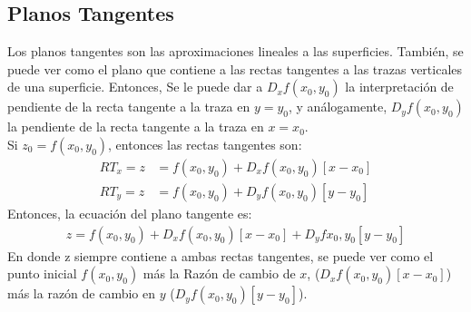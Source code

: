 \documentclass[12pt, letterpaper]{report}
\begin{document}
\subsection*{Planos Tangentes}
Los planos tangentes son las aproximaciones lineales a las superficies. También, se puede ver como el 
plano que contiene a las rectas tangentes a las trazas verticales de una superficie. Entonces, 
Se le puede dar a $D_{x}f(x_0, y_0)$ la interpretación de pendiente de la recta tangente a la traza en $y = y_0$, y 
análogamente, $D_yf(x_0, y_0)$ la pendiente de la recta tangente a la traza en $x = x_0$. \\ 

Si $z_0 = f(x_0, y_0)$, entonces las rectas tangentes son: 
\begin{align}
RT_x = z &= f(x_0, y_0) + D_xf(x_0, y_0)[x-x_0] \\
RT_y = z &= f(x_0, y_0) + D_yf(x_0, y_0)[y-y_0]
\end{align} Entonces, la ecuación del plano tangente es: 
\begin{align}  
z = f(x_0, y_0) + D_xf(x_0, y_0)[x-x_0] + D_yf{x_0, y_0}[y-y_0]
\end{align} En donde z siempre contiene a ambas rectas tangentes, se puede ver como el punto inicial $f(x_0, y_0)$ más 
la Razón de cambio de $x$, ($D_xf(x_0, y_0)[x-x_0]$) más la razón de cambio en $y$ ($D_yf(x_0, y_0)[y-y_0]$). \\
\end{document}
